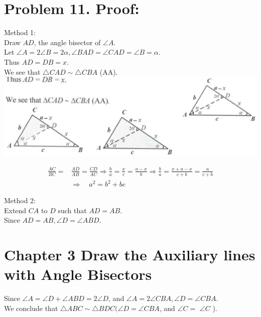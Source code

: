 \documentclass[10pt]{article}
\begin{document}
\section*{Problem 11. Proof:}
Method 1:\\
Draw \(A D\), the angle bisector of \(\angle A\).\\
Let \(\angle A=2 \angle B=2 \alpha, \angle B A D=\angle C A D=\angle B=\alpha\).\\
Thus \(A D=D B=x\).\\
We see that \(\triangle C A D \sim \triangle C B A\) (AA).\\
\includegraphics[max width=\textwidth, center]{2025_04_17_97bc1f7e44d93c271a88g-071(1)}

\[
\begin{aligned}
\frac{A C}{B C}= & \frac{A D}{A B}=\frac{C D}{A C} \Rightarrow \frac{b}{a}=\frac{x}{c}=\frac{a-x}{b} \Rightarrow \frac{b}{a}=\frac{x+a-x}{c+b}=\frac{a}{c+b} \\
& \Rightarrow \quad a^{2}=b^{2}+b c
\end{aligned}
\]

Method 2:\\
Extend \(C A\) to \(D\) such that \(A D=A B\).\\
Since \(A D=A B, \angle D=\angle A B D\).

\section*{Chapter 3 Draw the Auxiliary lines with Angle Bisectors}
Since \(\angle A=\angle D+\angle A B D=2 \angle D\), and \(\angle A=2 \angle C B A, \angle D=\angle C B A\).\\
We conclude that \(\triangle A B C \sim \triangle B D C(\angle D=\angle C B A\), and \(\angle C=\) \(\angle C\) ).
\end{document}
